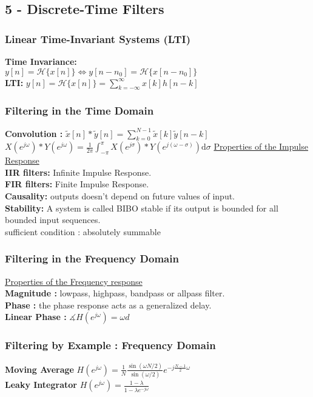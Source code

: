 \documentclass{article}
\begin{document}
\subsection{5 - Discrete-Time Filters}
\begin{multicols}{2}
%
\subsubsection{Linear Time-Invariant Systems (LTI)}
\textbf{Time Invariance:} \\$y[n] =  \mathscr{H}\{ x[n] \} \Leftrightarrow y[n-n_0] =  \mathscr{H}\{ x[n - n_0] \}$\\ 
\textbf{LTI:} $y[n] = \mathscr{H}\{ x[n] \} = \displaystyle \sum_{k=-\infty}^\infty x[k]h[n-k]$
%
\subsubsection{Filtering in the Time Domain}
\textbf{Convolution :} $\tilde x[n] * \tilde y[n] = \displaystyle \sum_{k=0}^{N-1}\tilde x[k] \tilde y[n-k]$\\
$X(e^{j\omega}) * Y(e^{j\omega}) = \frac1{2\pi} \int_{-\pi}^{\pi} X(e^{j\sigma}) * Y(e^{j(\omega-\sigma)}) \mathrm{d}\sigma$
\underline{Properties of the Impulse Response}\\
\textbf{IIR filters:} Infinite Impulse Response.\\
\textbf{FIR filters:} Finite Impulse Response.  \\
\textbf{Causality:} outputs doesn't depend on future values of input. \\
\textbf{Stability:} A system is called BIBO stable if its output is bounded for all bounded input sequences.\\
sufficient condition : absolutely summable
\subsubsection{Filtering in the Frequency Domain}
\underline{Properties of the Frequency response}\\
\textbf{Magnitude :} lowpass, highpass, bandpass or allpass filter. \\
\textbf{Phase :} the phase response acts as a generalized delay. \\
\textbf{Linear Phase :} $\measuredangle H(e^{j\omega}) = \omega d$\\
%
\subsubsection{Filtering by Example : Frequency Domain}
\textbf{Moving Average} $ H(e^{j\omega}) = \frac1N \frac{\sin(\omega N/2)}{\sin(\omega/2)} e^{-j\frac{N-1}2 \omega} $\\
\textbf{Leaky Integrator} $H(e^{j\omega}) = \frac{1-\lambda}{1-\lambda e^{-j\omega}} $
%

\end{multicols}
\end{document}
